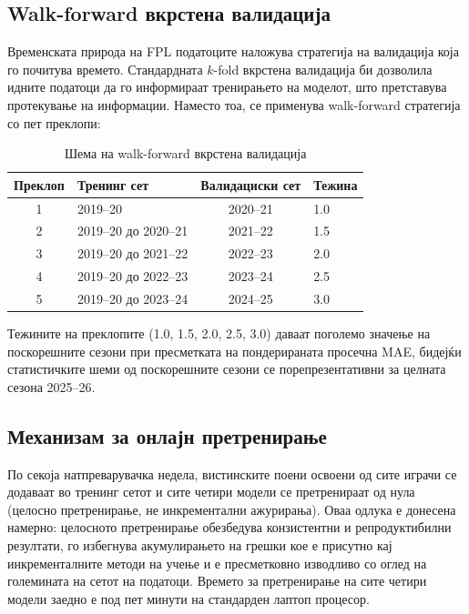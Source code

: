 \subsection{Walk-forward вкрстена валидација}

Временската природа на FPL податоците наложува стратегија на валидација која го почитува времето. Стандардната $k$-fold вкрстена валидација би дозволила идните податоци да го информираат тренирањето на моделот, што претставува протекување на информации. Наместо тоа, се применува walk-forward стратегија со пет преклопи:

\begin{table}[h]
\centering
\caption{Шема на walk-forward вкрстена валидација}
\label{tab:walkforward_en}
\begin{tabular}{clcl}
\toprule
\textbf{Преклоп} & \textbf{Тренинг сет} & \textbf{Валидациски сет} & \textbf{Тежина} \\
\midrule
1 & 2019--20                      & 2020--21 & 1.0 \\
2 & 2019--20 до 2020--21          & 2021--22 & 1.5 \\
3 & 2019--20 до 2021--22          & 2022--23 & 2.0 \\
4 & 2019--20 до 2022--23          & 2023--24 & 2.5 \\
5 & 2019--20 до 2023--24          & 2024--25 & 3.0 \\
\bottomrule
\end{tabular}
\end{table}

Тежините на преклопите (1.0, 1.5, 2.0, 2.5, 3.0) даваат поголемо значење на поскорешните сезони при пресметката на пондерираната просечна MAE, бидејќи статистичките шеми од поскорешните сезони се порепрезентативни за целната сезона 2025--26.

\subsection{Механизам за онлајн претренирање}

По секоја натпреварувачка недела, вистинските поени освоени од сите играчи се додаваат во тренинг сетот и сите четири модели се претренираат од нула (целосно претренирање, не инкрементални ажурирања). Оваа одлука е донесена намерно: целосното претренирање обезбедува конзистентни и репродуктибилни резултати, го избегнува акумулирањето на грешки кое е присутно кај инкременталните методи на учење и е пресметковно изводливо со оглед на големината на сетот на податоци. Времето за претренирање на сите четири модели заедно е под пет минути на стандарден лаптоп процесор.

